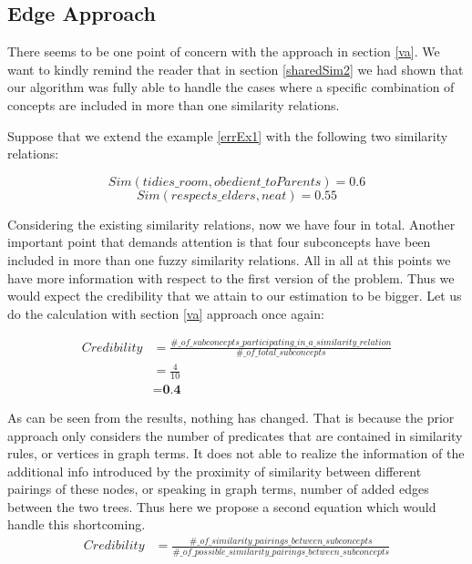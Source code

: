 \documentclass[egilmezThesis.tex]{subfiles}
\begin{document}
\subsection{Edge Approach}
\label{ea}

There seems to be one point of concern with the approach in section \ref{va}. We want to kindly remind the reader that in section \ref{sharedSim2} we had shown that our algorithm was fully able to handle the cases where a specific combination of concepts are included in more than one similarity relations. 

\begin{ex} 
\label{errEx2}
Suppose that we extend the example \ref{errEx1} with the following two similarity relations:

\[Sim(tidies\_room, obedient\_toParents) = 0.6\]
\[Sim(respects\_elders, neat) = 0.55\]
\end{ex}

Considering the existing similarity relations, now we have four in total. Another important point that demands attention is that four subconcepts have been included in more than one fuzzy similarity relations. All in all at this points we have more information with respect to the first version of the problem. Thus we would expect the credibility that we attain to our estimation to be bigger. Let us do the calculation with section \ref{va} approach once again: 

 \begin{equation}
\begin{split}
\textit{Credibility} &= \frac{\#\_of\_subconcepts\_participating\_in\_a\_similarity\_relation}{\#\_of\_total\_subconcepts} \\
&= \frac{4}{10} \\
&= \textbf{0.4} 
\end{split}
\end{equation}

As can be seen from the results, nothing has changed. That is because the prior approach only considers the number of predicates that are contained in similarity rules, or vertices in graph terms. It does not able to realize the information of the additional info introduced by the proximity of similarity between different pairings of these nodes, or speaking in graph terms, number of added edges between the two trees. Thus here we propose a second equation which would handle this shortcoming.
\begin{equation}
\begin{split}
\textit{Credibility} &= \frac{\#\_of\_similarity\_pairings\_between\_subconcepts}{\#\_of\_possible\_similarity\_pairings\_between\_subconcepts} \\
\end{split}
\end{equation}
\end{document}

